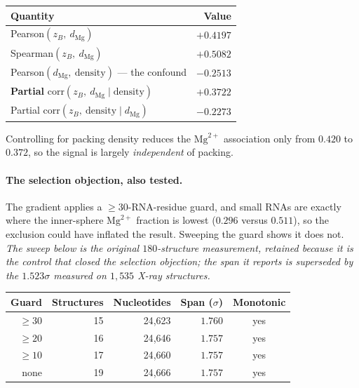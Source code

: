 \documentclass[11pt,a4paper]{article}
\begin{document}
\begin{table}[h]
\centering
\small
\begin{tabular}{lr}
\toprule
\textbf{Quantity} & \textbf{Value} \\
\midrule
Pearson$(z_B,\ d_{\mathrm{Mg}})$ & $+0.4197$ \\
Spearman$(z_B,\ d_{\mathrm{Mg}})$ & $+0.5082$ \\
Pearson$(d_{\mathrm{Mg}},\ \text{density})$ --- the confound & $-0.2513$ \\
\textbf{Partial} corr$(z_B,\ d_{\mathrm{Mg}} \mid \text{density})$ & $\mathbf{+0.3722}$ \\
Partial corr$(z_B,\ \text{density} \mid d_{\mathrm{Mg}})$ & $-0.2273$ \\
\bottomrule
\end{tabular}
\end{table}

Controlling for packing density reduces the $\mathrm{Mg}^{2+}$ association only
from $0.420$ to $0.372$, so the signal is largely \emph{independent} of packing.

\paragraph{The selection objection, also tested.} The gradient applies a
$\geq30$-RNA-residue guard, and small RNAs are exactly where the inner-sphere
$\mathrm{Mg}^{2+}$ fraction is lowest ($0.296$ versus $0.511$), so the exclusion
could have inflated the result. Sweeping the guard shows it does not. \emph{The
sweep below is the original $180$-structure measurement, retained because it is
the control that closed the selection objection; the span it reports is
superseded by the $1.523\sigma$ measured on $1{,}535$ X-ray structures.}

\begin{table}[h]
\centering
\small
\begin{tabular}{@{}rrrrc@{}}
\toprule
\textbf{Guard} & \textbf{Structures} & \textbf{Nucleotides} & \textbf{Span ($\sigma$)} & \textbf{Monotonic} \\
\midrule
$\geq 30$ & 15 & 24{,}623 & $\mathbf{1.760}$ & yes \\
$\geq 20$ & 16 & 24{,}646 & $1.757$ & yes \\
$\geq 10$ & 17 & 24{,}660 & $1.757$ & yes \\
none      & 19 & 24{,}666 & $\mathbf{1.757}$ & yes \\
\bottomrule
\end{tabular}
\end{table}
\end{document}

